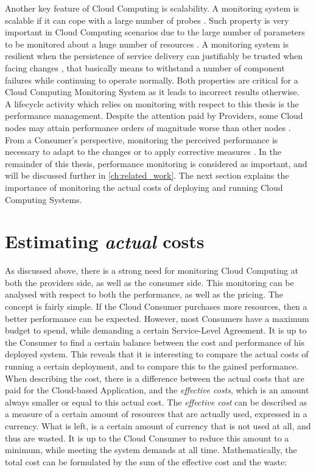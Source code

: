 \noindent
Another key feature of Cloud Computing is scalability. A monitoring system is scalable if it can cope with a large number of probes \cite{clayman2010monitoring}. Such property is very important in Cloud Computing scenarios due to the large number of parameters to be monitored about a huge number of resources \cite{aceto2013cloud}. A monitoring system is resilient when the persistence of service delivery can justifiably be trusted when facing changes \cite{laprie2008dependability}, that basically means to withstand a number of component failures while continuing to operate normally. Both properties are critical for a Cloud Computing Monitoring System as it leads to incorrect results otherwise.\\

\noindent
A lifecycle activity which relies on monitoring with respect to this thesis is the performance management. Despite the attention paid by Providers, some Cloud nodes may attain performance orders of magnitude worse than other nodes \cite{fox2009above}. From a Consumer's perspective, monitoring the perceived performance is necessary to adapt to the changes or to apply corrective measures \cite{aceto2013cloud}. In the remainder of this thesis, performance monitoring is considered as important, and will be discussed further in \autoref{ch:related_work}. The next section explains the importance of monitoring the actual costs of deploying and running Cloud Computing Systems.

\section{Estimating \textit{actual} costs} \label{sec:intro_pricing}
As discussed above, there is a strong need for monitoring Cloud Computing at both the providers side, as well as the consumer side. This monitoring can be analysed with respect to both the performance, as well as the pricing. The concept is fairly simple. If the Cloud Consumer purchases more resources, then a better performance can be expected. However, most Consumers have a maximum budget to spend, while demanding a certain Service-Level Agreement. It is up to the Consumer to find a certain balance between the cost and performance of his deployed system. This reveals that it is interesting to compare the actual costs of running a certain deployment, and to compare this to the gained performance. When describing the cost, there is a difference between the actual costs that are paid for the Cloud-based Application, and the \textit{effective costs}, which is an amount always smaller or equal to this actual cost. The \textit{effective cost} can be described as a measure of a certain amount of resources that are actually used, expressed in a currency. What is left, is a certain amount of currency that is not used at all, and thus are wasted. It is up to the Cloud Consumer to reduce this amount to a minimum, while meeting the system demands at all time. Mathematically, the total cost can be formulated by the sum of the effective cost and the waste:

